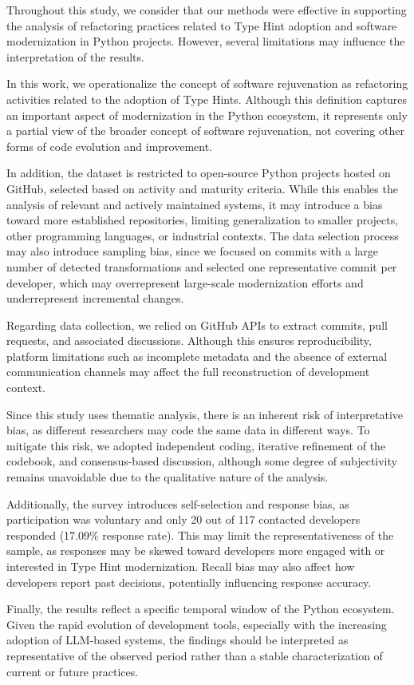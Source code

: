 Throughout this study, we consider that our methods were effective in supporting the analysis of refactoring practices related to Type Hint adoption and software modernization in Python projects. However, several limitations may influence the interpretation of the results.

In this work, we operationalize the concept of software rejuvenation as refactoring activities related to the adoption of Type Hints. Although this definition captures an important aspect of modernization in the Python ecosystem, it represents only a partial view of the broader concept of software rejuvenation, not covering other forms of code evolution and improvement.

In addition, the dataset is restricted to open-source Python projects hosted on GitHub, selected based on activity and maturity criteria. While this enables the analysis of relevant and actively maintained systems, it may introduce a bias toward more established repositories, limiting generalization to smaller projects, other programming languages, or industrial contexts. The data selection process may also introduce sampling bias, since we focused on commits with a large number of detected transformations and selected one representative commit per developer, which may overrepresent large-scale modernization efforts and underrepresent incremental changes.

Regarding data collection, we relied on GitHub APIs to extract commits, pull requests, and associated discussions. Although this ensures reproducibility, platform limitations such as incomplete metadata and the absence of external communication channels may affect the full reconstruction of development context.

Since this study uses thematic analysis, there is an inherent risk of interpretative bias, as different researchers may code the same data in different ways. To mitigate this risk, we adopted independent coding, iterative refinement of the codebook, and consensus-based discussion, although some degree of subjectivity remains unavoidable due to the qualitative nature of the analysis.

Additionally, the survey introduces self-selection and response bias, as participation was voluntary and only 20 out of 117 contacted developers responded (17.09\% response rate). This may limit the representativeness of the sample, as responses may be skewed toward developers more engaged with or interested in Type Hint modernization. Recall bias may also affect how developers report past decisions, potentially influencing response accuracy.

Finally, the results reflect a specific temporal window of the Python ecosystem. Given the rapid evolution of development tools, especially with the increasing adoption of LLM-based systems, the findings should be interpreted as representative of the observed period rather than a stable characterization of current or future practices.

